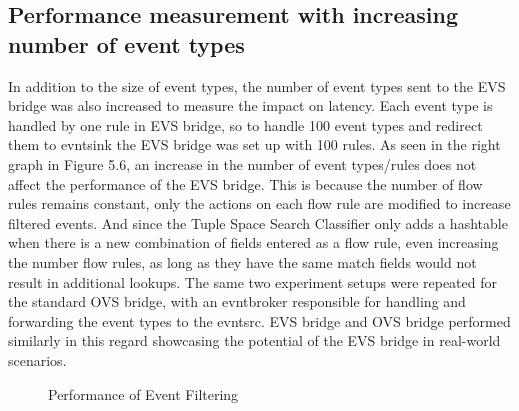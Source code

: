 \subsection{Performance measurement with increasing number of event types } 
In addition to the size of event types, the number of event types sent to the EVS bridge was also increased to measure the impact on latency. Each event type is handled by one rule in EVS bridge, so to handle 100 event types and redirect them to evntsink the EVS bridge was set up with 100 rules. As seen in the right graph in Figure 5.6, an increase in the number of event types/rules does not affect the performance of the EVS bridge. This is because the number of flow rules remains constant, only the actions on each flow rule are modified to increase filtered events. And since the Tuple Space Search Classifier only adds a hashtable when there is a new combination of fields entered as a flow rule, even increasing the number flow rules, as long as they have the same match fields would not result in additional lookups.
The same two experiment setups were repeated for the standard OVS bridge, with an evntbroker responsible for handling and forwarding the event types to the evntsrc. EVS bridge and OVS bridge performed similarly in this regard showcasing the potential of the EVS bridge in real-world scenarios.



\begin{figure}[H]
 \centering
 \caption{Performance of Event Filtering}
\end{figure} 


